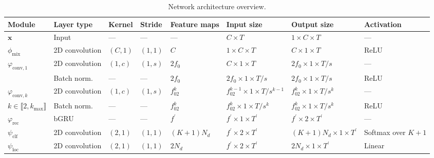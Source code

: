 \begin{landscape}
\begin{table}[tb]
    \begin{threeparttable}
        \centering
        \caption[MSED architecture overview]{Network architecture overview.} 
        \label{tab:paperv-architecture}
        \begin{tabular}{@{}llllllll@{}}
            \toprule
            \textbf{Module} & \textbf{Layer type} & \textbf{Kernel} & \textbf{Stride} & \textbf{Feature maps} & \textbf{Input size} & \textbf{Output size} & \textbf{Activation} \\ \midrule
            \(\mathbf{x}\) & Input & --- & --- & --- & \( C \times T \) & \( 1 \times C \times T \) & --- \\
            \( \phi_{\mathrm{mix}} \) & 2D convolution & \( (C, 1) \) & \( (1, 1) \) & \( C \) & \( 1 \times C \times T \) & \( C \times 1 \times T \) & ReLU \\ \midrule
            \( \varphi_{\mathrm{conv},1} \) & 2D convolution & \( (1, c) \) & \( (1, s) \) & \( 2f_0 \) & \( C \times 1 \times T \) & \( 2f_0 \times 1 \times T/s \) & --- \\
            & Batch norm. & --- & --- & \(2f_0\) & \(2f_0 \times 1 \times T/s\) & \(2f_0 \times 1 \times T/s\) & ReLU \\
            \( \varphi_{\mathrm{conv},k} \) & 2D convolution & \( (1, c) \) & \( (1, s) \) & \( f_02^{k} \) & \( f_02^{k-1} \times 1 \times T/s^{k-1} \) & \( f_02^{k} \times 1 \times T/s^k \) & --- \\
            \( k \in \llbracket 2, k_{\mathrm{max}} \rrbracket \) & Batch norm. & --- & --- & \(f_02^{k}\) & \(f_02^{k} \times 1 \times T/s^k\) & \(f_02^{k} \times 1 \times T/s^k\) & ReLU \\
            \( \varphi_{\mathrm{rec}} \) & bGRU & --- & --- & $f^{\prime}$ & \( f^{\prime} \times 1 \times T^{\prime} \) & \( f^{\prime} \times 2 \times T^{\prime} \) & --- \\ \midrule
            \( \psi_{\mathrm{clf}} \) & 2D convolution & \( (2, 1) \) & \( (1, 1) \) & \( \left( K + 1 \right) \! N_d \) & $f^{\prime} \times 2 \times T^{\prime}$ & $\left( K + 1 \right) \! N_d \times 1 \times T^{\prime}$ & Softmax over \( K + 1 \) \\
            \( \psi_{\mathrm{loc}} \) & 2D convolution & \( (2, 1) \) & \( (1, 1) \) & \( 2 N_d \) & $f^{\prime} \times 2 \times T^{\prime}$ & $2 N_d \times 1 \times T^{\prime}$ & Linear \\ \midrule

\end{tabular}
\end{threeparttable}
\end{table}
\end{landscape}
